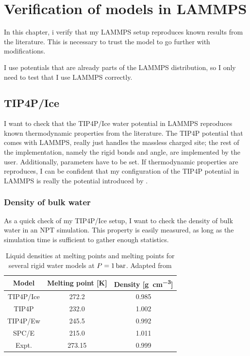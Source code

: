 \chapter{Verification of models in LAMMPS}
\label{ch:verification}
In this chapter, i verify that my LAMMPS setup reproduces known results from the literature. This is necessary to trust the model to go further with modifications.

I use potentials that are already parts of the LAMMPS distribution, so I only need to test that I use LAMMPS correctly. 

\section{TIP4P/Ice}
I want to check that the TIP4P/Ice water potential in LAMMPS reproduces known thermodynamic properties from the literature. The TIP4P potential that comes with LAMMPS, really just handles the massless charged site; the rest of the implementation, namely the rigid bonds and angle, are implemented by the user. Additionally, parameters have to be set. If thermodynamic properties are reproduces, I can be confident that my configuration of the TIP4P potential in LAMMPS is really the potential introduced by \cite{Abascal2005}. 

\subsection{Density of bulk water}
As a quick check of my TIP4P/Ice setup, I want to check the density of bulk water in an NPT simulation. This property is easily measured, as long as the simulation time is sufficient to gather enough statistics. 

\begin{table}
\centering
\caption{Liquid densities at melting points and melting points for several rigid water models at $P = \text{\SI{1}{\bar}}$. Adapted from \cite{Abascal2005}}
\begin{tabular}{c|cc}
Model & Melting point [K] & Density [\si{\gram\per\cubic\cm}] \\
\hline
TIP4P/Ice 	& 272.2 	& 0.985 \\
TIP4P 		& 232.0 	& 1.002 \\
TIP4P/Ew 	& 245.5 	& 0.992 \\
SPC/E 		& 215.0 	& 1.011 \\
Expt. 		& 273.15 	& 0.999
\end{tabular}
\end{table}

